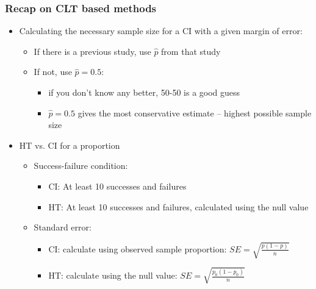 \documentclass[slidestop,compress,mathserif,12pt,t,professionalfonts,xcolor=table]{beamer}
\begin{document}
\begin{frame}
\frametitle{Recap on CLT based methods}

\begin{itemize}

\item Calculating the necessary sample size for a CI with a given margin of error:
\begin{itemize}
\item If there is a previous study, use $\hat{p}$ from that study
\item If not, use $\hat{p} = 0.5$:
\begin{itemize}
\item if you don't know any better, 50-50 is a good guess
\item $\hat{p} = 0.5$ gives the most conservative estimate -- highest possible sample size
\end{itemize}
\end{itemize}

\pause

\item HT vs. CI for a proportion
\begin{itemize}

\item Success-failure condition:
\begin{itemize}
\item CI: At least 10  successes and failures
\item HT: At least 10  successes and failures, calculated using the null value
\end{itemize}

\item Standard error:
\begin{itemize}
\item CI: calculate using observed sample proportion: $SE = \sqrt{\frac{p(1-p)}{n}}$
\item HT: calculate using the null value: $SE = \sqrt{\frac{p_0(1-p_0)}{n}}$
\end{itemize}

\end{itemize}


\end{itemize}

\end{frame}

\end{document}
